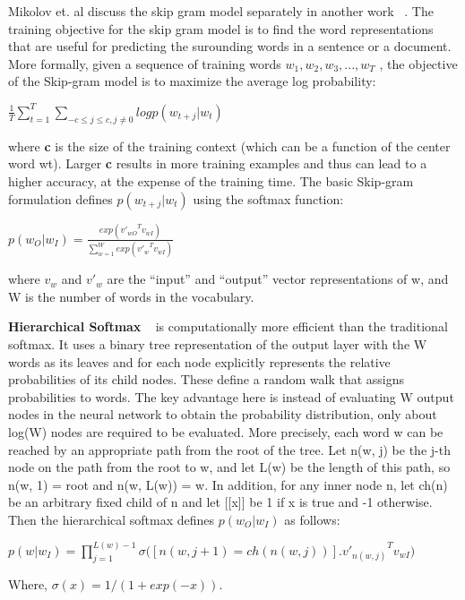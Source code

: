 Mikolov et. al  discuss the skip gram model separately in another work ~\parencite{mikolov2}. The training objective for the skip gram model is to find the word representations that are useful for predicting the surounding words in a sentence or a document. More formally, given a sequence of training words ${w}_{1}, {w}_{2}, {w}_{3}, . . . , {w}_{T}$ , the objective of the Skip-gram model is to maximize the average log probability:

\begin{center}
$  \frac{1}{T} \sum_{t=1}^{T} \sum_{-c \leq j  \leq c, j \neq 0} log p({w}_{t+j} | {w}_{t})  $
\end{center}

where \textbf{c} is the size of the training context (which can be a function of the center word wt). Larger \textbf{c} results in more training examples and thus can lead to a higher accuracy, at the expense of the training time. The basic Skip-gram formulation defines $p({w}_{t+j} | {w}_{t})$ using the softmax function:
\begin{center}
$p({w}_{O}|{w}_{I}) = \frac{exp({{v'}_{wO}}^{T} {v}_{wI} )}{ \sum_{w=1}^{W} exp({{v'}_{w}}^{T} {v}_{wI} ) }$
\end{center}

where ${v}_{w}$ and ${v'}_{w}$ are the “input” and “output” vector representations of w, and W is the number of words in the vocabulary. 
\newline

\textbf{Hierarchical Softmax} ~\parencite{morbengio} is computationally more efficient than the traditional softmax. It uses a binary tree representation of the output layer with the W words as its leaves and for each node explicitly represents the relative probabilities of its child nodes. These define a random walk that assigns probabilities to words. The key advantage here is instead of evaluating W output nodes in the neural network to obtain the probability distribution, only about log(W) nodes are required to be evaluated. More precisely, each word w can be reached by an appropriate path from the root of the tree. Let n(w, j) be the j-th node on the path from the root to w, and let L(w) be the length of this path, so n(w, 1) = root and n(w, L(w)) = w. In addition, for any inner node n, let ch(n) be an arbitrary fixed child of n and let [[x]] be 1 if x is true and -1 otherwise. Then the hierarchical softmax defines $p({w}_{O}|{w}_{I})$ as follows:
\begin{center}
$p({w}|{w}_{I}) =  \prod_{j=1}^{L(w)-1}  \sigma  \big( [ n (w, j + 1) = ch (n(w,j))]. {{v'}_{n(w,j)}}^{T} {v}_{wI} \big)$ 
\end{center}
Where, $\sigma(x) = 1/ (1 + exp(-x)).$
\newline

